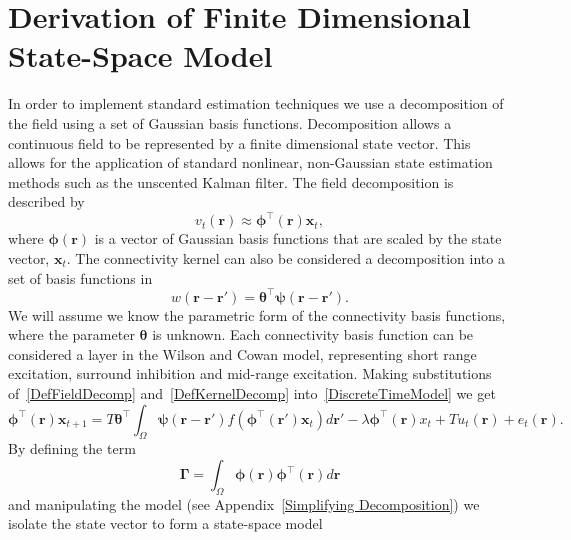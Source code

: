 \documentclass[onecolumn,draftcls]{IEEEtran}
\begin{document}
\section{Derivation of Finite Dimensional State-Space Model}
In order to implement standard estimation techniques we use a decomposition of the field using a set of Gaussian basis functions. Decomposition allows a continuous field to be represented by a finite dimensional state vector. This allows for the application of standard nonlinear, non-Gaussian state estimation methods such as the unscented Kalman filter. The field decomposition is described by
\begin{equation}\label{DefFieldDecomp}
	v_t\left(\mathbf{r}\right) \approx \boldsymbol{\phi}^{\top}\left(\mathbf{r}\right) \mathbf{x}_t,
\end{equation}
where $\mathbf{\boldsymbol{\phi}}(\mathbf{r})$ is a vector of Gaussian basis functions that are scaled by the state vector, $\mathbf{x}_t$. The connectivity kernel can also be considered a decomposition into a set of basis functions in 
\begin{equation}\label{DefKernelDecomp}
	w\left(\mathbf{r}-\mathbf{r}'\right) = \boldsymbol{\theta}^{\top} \boldsymbol{\psi}\left(\mathbf{r}-\mathbf{r}'\right).
\end{equation}
We will assume we know the parametric form of the connectivity basis functions, where the parameter $\boldsymbol{\theta}$ is unknown. Each connectivity basis function can be considered a layer in the Wilson and Cowan model, representing short range excitation, surround inhibition and mid-range excitation. Making substitutions of~\ref{DefFieldDecomp} and~\ref{DefKernelDecomp} into~\ref{DiscreteTimeModel} we get
\begin{equation}\label{reduced continuous model}
	\boldsymbol{\phi}^{\top}\left( \mathbf{r} \right) \mathbf{x}_{t+1} = T\boldsymbol{\theta}^{\top}\int_\Omega  {\boldsymbol{\psi} \left(\mathbf{r}-\mathbf{r}'\right) f\left( \boldsymbol{\phi} ^{\top}\left(\mathbf{r}'\right)\mathbf{x}_t \right)d\mathbf{r}'}  - \lambda\boldsymbol{\phi}^{\top}\left(\mathbf{r}\right)x_t + T u_t\left(\mathbf{r}\right) + e_t\left(\mathbf{r}\right).
\end{equation}
By defining the term
\begin{equation}\label{DefGamma}
	\boldsymbol{\Gamma}  = \int_\Omega  {\boldsymbol{\phi} \left(\mathbf{r}\right)\boldsymbol{\phi} ^{\top}\left(\mathbf{r}\right)d\mathbf{r}}
\end{equation}
and manipulating the model (see Appendix~\ref{Simplifying Decomposition}) we isolate the state vector to form a state-space model
\end{document}
